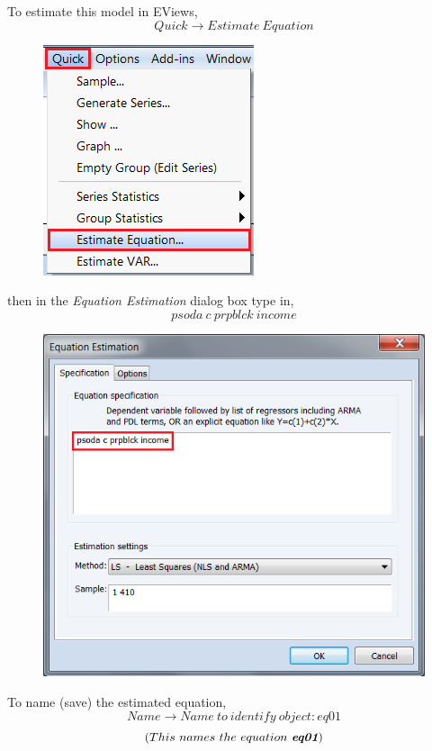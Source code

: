 \documentclass[12pt]{report}
\begin{document}
\noindent To estimate this model in EViews,
$$Quick \to Estimate\ Equation$$
\begin{figure}[H]
	\centering
	\includegraphics{tute5_11}
\end{figure}
\vspace{-\baselineskip}
\noindent then in the \textit{Equation Estimation} dialog box type in,
$$psoda\ c\ prpblck\ income$$
\begin{figure}[H]
	\centering
	\includegraphics{tute5_12}
\end{figure}
\vspace{-\baselineskip}
\noindent To name (save) the estimated equation,
$$Name \to Name\ to\ identify\ object: eq01$$
$$(This\ names\ the\ equation\ \textit{\textbf{eq01}})$$
\end{document}

